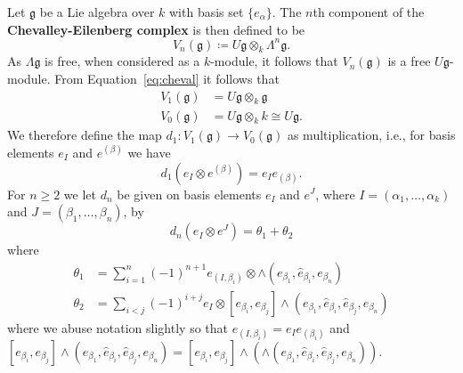 \begin{definition}
  Let $ \mathfrak{g} $ be a Lie algebra over $ k $ with basis set $ \{e_{\alpha}\} $. The $ n $th component of the \textbf{Chevalley-Eilenberg complex} is then defined to be
  \begin{equation}
    V_n(\mathfrak{g}) \coloneqq U\mathfrak{g} \otimes_k \Lambda^{n} \mathfrak{g}.
    \label{eq:cheval}
  \end{equation}
  As $ \Lambda \mathfrak{g} $ is free, when considered as a $ k $-module, it follows that $ V_n(\mathfrak{g}) $ is a free $ U\mathfrak{g} $-module. From Equation~\ref{eq:cheval} it follows that
  \begin{align*}
    V_1(\mathfrak{g}) &= U\mathfrak{g} \otimes_k \mathfrak{g} \\
    V_0(\mathfrak{g}) &= U\mathfrak{g} \otimes_k k \cong U\mathfrak{g}
  .\end{align*}
  We therefore define the map $ d_1: V_1(\mathfrak{g}) \to V_0(\mathfrak{g}) $ as multiplication, i.e., for basis elements $ e_I $ and $ e^{(\beta)} $ we have
  \begin{equation}
    d_1(e_I \otimes e^{(\beta)}) = e_I e_{(\beta)}.
  \end{equation}
  For $ n\geq 2 $ we let $ d_n $ be given on basis elements $ e_I $ and $ e^J $, where $ I = (\alpha_1, \ldots, \alpha_k) $ and $ J = (\beta_1, \ldots, \beta_n) $, by
  \begin{equation}
    d_n(e_I \otimes e^J) = \theta_1 + \theta_2
  \end{equation}
  where
  \begin{align*}
    \theta_1 &= \sum_{i = 1}^{n} (-1)^{n + 1}e_{(I, \beta_i)} \otimes \wedge(e_{\beta_1}, \widehat{e}_{\beta_i}, e_{\beta_n}) \\
    \theta_2 &= \sum_{i < j} (-1)^{i + j}e_I \otimes [e_{\beta_i}, e_{\beta_j}] \wedge(e_{\beta_1}, \widehat{e}_{\beta_i}, \widehat{e}_{\beta_j}, e_{\beta_n})
  \end{align*}
  where we abuse notation slightly so that $ e_{(I, \beta_i)} = e_{I}e_{(\beta_i)} $ and $ [e_{\beta_i}, e_{\beta_j}]\wedge (e_{\beta_1}, \widehat{e}_{\beta_i}, \widehat{e}_{\beta_j}, e_{\beta_n}) = [e_{\beta_i}, e_{\beta_j}]\wedge(\wedge(e_{\beta_1}, \widehat{e}_{\beta_i}, \widehat{e}_{\beta_j}, e_{\beta_n})) $.
\end{definition}

